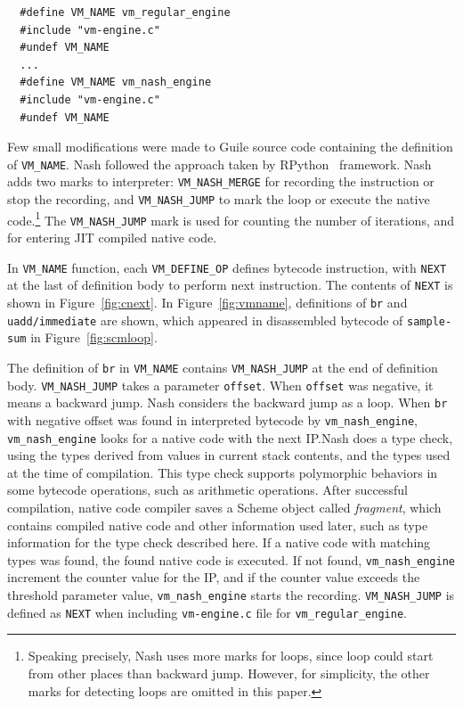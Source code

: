 \documentclass[preprint]{sigplanconf}
\begin{document}
\begin{verbatim}
  #define VM_NAME vm_regular_engine
  #include "vm-engine.c"
  #undef VM_NAME
  ...
  #define VM_NAME vm_nash_engine
  #include "vm-engine.c"
  #undef VM_NAME
\end{verbatim}

Few small modifications were made to Guile source code containing the
definition of \texttt{VM\_NAME}.  Nash followed the approach taken by
RPython~\cite{bolz2009tracing} framework.  Nash adds two marks to interpreter:
\texttt{VM\_NASH\_MERGE} for recording the instruction or stop the recording,
and \texttt{VM\_NASH\_JUMP} to mark the loop or execute the native
code.\footnote{ Speaking precisely, Nash uses more marks for loops, since loop
  could start from other places than backward jump. However, for simplicity,
  the other marks for detecting loops are omitted in this paper.} The
\texttt{VM\_NASH\_JUMP} mark is used for counting the number of iterations,
and for entering JIT compiled native code.

In \texttt{VM\_NAME} function, each \texttt{VM\_DEFINE\_OP} defines bytecode
instruction, with \texttt{NEXT} at the last of definition body to perform next
instruction. The contents of \texttt{NEXT} is shown in
Figure~\hyperref[fig:cnext]{\ref{fig:cnext}}. In
Figure~\hyperref[fig:vmname]{\ref{fig:vmname}}, definitions of \texttt{br} and
\texttt{uadd/immediate} are shown, which appeared in disassembled bytecode of
\texttt{sample-sum} in Figure~\hyperref[fig:scmloop]{\ref{fig:scmloop}}.

The definition of \texttt{br} in \texttt{VM\_NAME} contains
\texttt{VM\_NASH\_JUMP} at the end of definition body. \texttt{VM\_NASH\_JUMP}
takes a parameter \texttt{offset}. When \texttt{offset} was negative, it means
a backward jump. Nash considers the backward jump as a loop. When \texttt{br}
with negative offset was found in interpreted bytecode by
\texttt{vm\_nash\_engine}, \texttt{vm\_nash\_engine} looks for a native code
with the next IP.\@ Nash does a type check, using the types derived from
values in current stack contents, and the types used at the time of
compilation. This type check supports polymorphic behaviors in some bytecode
operations, such as arithmetic operations. After successful compilation,
native code compiler saves a Scheme object called \textit{fragment}, which
contains compiled native code and other information used later, such as type
information for the type check described here. If a native code with matching
types was found, the found native code is executed. If not found,
\texttt{vm\_nash\_engine} increment the counter value for the IP, and if the
counter value exceeds the threshold parameter value, \texttt{vm\_nash\_engine}
starts the recording. \texttt{VM\_NASH\_JUMP} is defined as \texttt{NEXT} when
including \texttt{vm-engine.c} file for \texttt{vm\_regular\_engine}.
\end{document}
